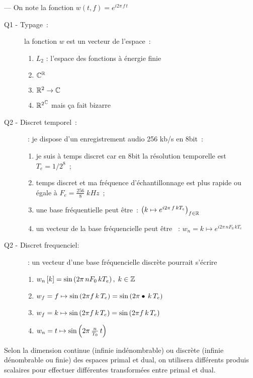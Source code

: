 \begin{quizz} --- On note la fonction $w(t,f)=e^{i2\pi\,f\,t}$
  \begin{description}
  \item[Q1 - Typage~:] la fonction $w$ est un vecteur de l'espace~:
    \begin{enumerate}
    \item $L_2$ : l'espace des fonctions à énergie finie
    \item $\mathbb{C}^{\mathbb{R}}$
    \item $\mathbb{R}^2\to\mathbb{C}$
    \item ${\mathbb{R}^2}^{\mathbb{C}}$ mais ça fait bizarre
    \end{enumerate}
  \item[Q2 - Discret temporel~:]~: je dispose d'un enregistrement audio
    256 kb/s en 8bit~:
    \begin{enumerate}
    \item je suis à temps discret car en 8bit la résolution temporelle
      est $T_e=1/2^8$~;
    \item temps discret et ma fréquence d'échantillonnage est plus
      rapide ou égale à $F_e=\frac{256}{8}\; kHz$~;
    \item une base fréquentielle peut être~:
      $\left( k\mapsto e^{i2\pi\,f\,k T_e}\right)_{f\in\mathbb{R}}$
    \item un vecteur de la base fréquencielle peut être ~:
      $w_n= k\mapsto e^{i2\pi\,n F_0\, k T_e}$
    \end{enumerate}
  \item[Q2 - Discret frequenciel:] ~: un vecteur d'une base
    fréquencielle discrète pourrait s'écrire
    \begin{enumerate}
    \item $w_n\left[k\right] = \sin\left(2\pi\,n F_0\,k T_e\right),\; k\in\mathbb{Z}$
    \item
      $w_f = f\mapsto\sin\left(2\pi f\,k\,T_e\right) = \sin\left(2\pi \bullet
        \,k\,T_e\right)$
    \item
      $w_f = k\mapsto\sin\left(2\pi f\,k\,T_e\right) = \sin\left(2\pi f \,k\,T_e\right)$
    \item $w_n = t\mapsto \sin\left(2\pi\, \frac{n}{T_0}\,t\right)$
    \end{enumerate}
  \end{description}
\end{quizz}


Selon la dimension continue (infinie indénombrable) ou discrète
(infinie dénombrable ou finie) des espaces primal et dual, on
utilisera différents produis scalaires pour effectuer différentes
transformées entre primal et dual.

